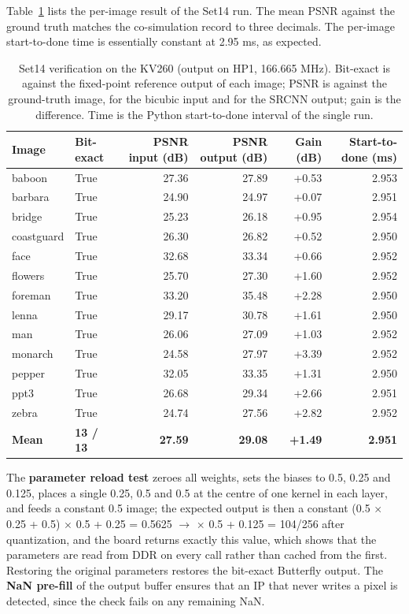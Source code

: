 Table~\ref{tab:13} lists the per-image result of the Set14 run. The mean PSNR against the ground truth matches the co-simulation record to three decimals. The per-image start-to-done time is essentially constant at 2.95 ms, as expected.

\begin{table}[!htbp]
\centering
\footnotesize
\caption{Set14 verification on the KV260 (output on HP1, 166.665 MHz). Bit-exact is against the fixed-point reference output of each image; PSNR is against the ground-truth image, for the bicubic input and for the SRCNN output; gain is the difference. Time is the Python start-to-done interval of the single run.}
\label{tab:13}
\begin{tabular}{llrrrr}
\toprule
Image & Bit-exact & PSNR input (dB) & PSNR output (dB) & Gain (dB) & Start-to-done (ms) \\
\midrule
baboon & True & 27.36 & 27.89 & +0.53 & 2.953 \\
barbara & True & 24.90 & 24.97 & +0.07 & 2.951 \\
bridge & True & 25.23 & 26.18 & +0.95 & 2.954 \\
coastguard & True & 26.30 & 26.82 & +0.52 & 2.950 \\
face & True & 32.68 & 33.34 & +0.66 & 2.952 \\
flowers & True & 25.70 & 27.30 & +1.60 & 2.952 \\
foreman & True & 33.20 & 35.48 & +2.28 & 2.950 \\
lenna & True & 29.17 & 30.78 & +1.61 & 2.950 \\
man & True & 26.06 & 27.09 & +1.03 & 2.952 \\
monarch & True & 24.58 & 27.97 & +3.39 & 2.952 \\
pepper & True & 32.05 & 33.35 & +1.31 & 2.950 \\
ppt3 & True & 26.68 & 29.34 & +2.66 & 2.951 \\
zebra & True & 24.74 & 27.56 & +2.82 & 2.952 \\
\textbf{Mean} & \textbf{13 / 13} & \textbf{27.59} & \textbf{29.08} & \textbf{+1.49} & \textbf{2.951} \\
\bottomrule
\end{tabular}
\end{table}

The \textbf{parameter reload test} zeroes all weights, sets the biases to 0.5, 0.25 and 0.125, places a single 0.25, 0.5 and 0.5 at the centre of one kernel in each layer, and feeds a constant 0.5 image; the expected output is then a constant (0.5 $\times$ 0.25 + 0.5) $\times$ 0.5 + 0.25 = 0.5625 $\rightarrow$ $\times$ 0.5 + 0.125 = 104/256 after quantization, and the board returns exactly this value, which shows that the parameters are read from DDR on every call rather than cached from the first. Restoring the original parameters restores the bit-exact Butterfly output. The \textbf{NaN pre-fill} of the output buffer ensures that an IP that never writes a pixel is detected, since the check fails on any remaining NaN.

